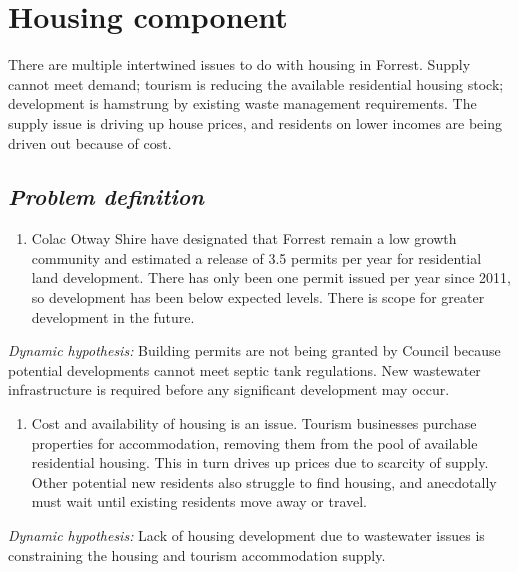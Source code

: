 \documentclass[
  11pt,
]{book}
\providecommand{\tightlist}{%
  \setlength{\itemsep}{0pt}\setlength{\parskip}{0pt}}
\begin{document}
\hypertarget{housing-component}{%
\chapter{Housing component}\label{housing-component}}

There are multiple intertwined issues to do with housing in Forrest. Supply cannot meet demand; tourism is reducing the available residential housing stock; development is hamstrung by existing waste management requirements. The supply issue is driving up house prices, and residents on lower incomes are being driven out because of cost.

\hypertarget{problem-definition-2}{%
\section{\texorpdfstring{\emph{Problem definition}}{Problem definition}}\label{problem-definition-2}}

\begin{enumerate}
\def\labelenumi{\arabic{enumi}.}
\tightlist
\item
  Colac Otway Shire have designated that Forrest remain a low growth community and estimated a release of 3.5 permits per year for residential land development. There has only been one permit issued per year since 2011, so development has been below expected levels. There is scope for greater development in the future.
\end{enumerate}

\emph{Dynamic hypothesis:}
Building permits are not being granted by Council because potential developments cannot meet septic tank regulations. New wastewater infrastructure is required before any significant development may occur.

\begin{enumerate}
\def\labelenumi{\arabic{enumi}.}
\setcounter{enumi}{1}
\tightlist
\item
  Cost and availability of housing is an issue. Tourism businesses purchase properties for accommodation, removing them from the pool of available residential housing. This in turn drives up prices due to scarcity of supply. Other potential new residents also struggle to find housing, and anecdotally must wait until existing residents move away or travel.
\end{enumerate}

\emph{Dynamic hypothesis:}
Lack of housing development due to wastewater issues is constraining the housing and tourism accommodation supply.
\end{document}
